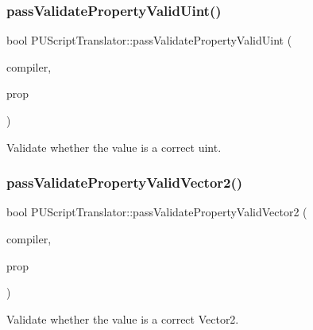 \subsubsection{\texorpdfstring{pass\+Validate\+Property\+Valid\+Uint()}{passValidatePropertyValidUint()}\hspace{0.1cm}{\footnotesize\ttfamily [2/2]}}
{\footnotesize\ttfamily bool P\+U\+Script\+Translator\+::pass\+Validate\+Property\+Valid\+Uint (\begin{DoxyParamCaption}\item[{\hyperlink{classPUScriptCompiler}{P\+U\+Script\+Compiler} $\ast$}]{compiler,  }\item[{\hyperlink{classPUPropertyAbstractNode}{P\+U\+Property\+Abstract\+Node} $\ast$}]{prop }\end{DoxyParamCaption})}

Validate whether the value is a correct uint. \mbox{\label{classPUScriptTranslator_ae4a91c272452a2ca3b2b0c814132d1ec}} 
\subsubsection{\texorpdfstring{pass\+Validate\+Property\+Valid\+Vector2()}{passValidatePropertyValidVector2()}\hspace{0.1cm}{\footnotesize\ttfamily [1/2]}}
{\footnotesize\ttfamily bool P\+U\+Script\+Translator\+::pass\+Validate\+Property\+Valid\+Vector2 (\begin{DoxyParamCaption}\item[{\hyperlink{classPUScriptCompiler}{P\+U\+Script\+Compiler} $\ast$}]{compiler,  }\item[{\hyperlink{classPUPropertyAbstractNode}{P\+U\+Property\+Abstract\+Node} $\ast$}]{prop }\end{DoxyParamCaption})}

Validate whether the value is a correct Vector2. \mbox{\label{classPUScriptTranslator_ae4a91c272452a2ca3b2b0c814132d1ec}} 
